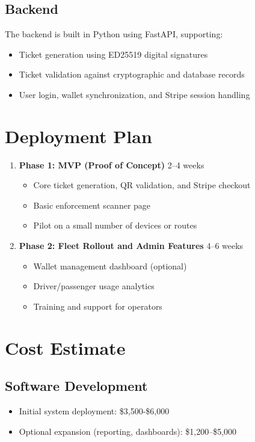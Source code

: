 \documentclass[12pt]{article}
\begin{document}
\subsection{Backend}
The backend is built in Python using FastAPI, supporting:
\begin{itemize}
    \item Ticket generation using ED25519 digital signatures
    \item Ticket validation against cryptographic and database records
    \item User login, wallet synchronization, and Stripe session handling
\end{itemize}

\section{Deployment Plan}
\begin{enumerate}
    \item \textbf{Phase 1: MVP (Proof of Concept)} \hfill 2–4 weeks
    \begin{itemize}
        \item Core ticket generation, QR validation, and Stripe checkout
        \item Basic enforcement scanner page
        \item Pilot on a small number of devices or routes
    \end{itemize}

    \item \textbf{Phase 2: Fleet Rollout and Admin Features} \hfill 4–6 weeks
    \begin{itemize}
        \item Wallet management dashboard (optional)
        \item Driver/passenger usage analytics
        \item Training and support for operators
    \end{itemize}
\end{enumerate}

\section{Cost Estimate}
\subsection*{Software Development}
\begin{itemize}
    \item Initial system deployment: \$3,500-\$6,000
    \item Optional expansion (reporting, dashboards): \$1,200–\$5,000
\end{itemize}
\end{document}
